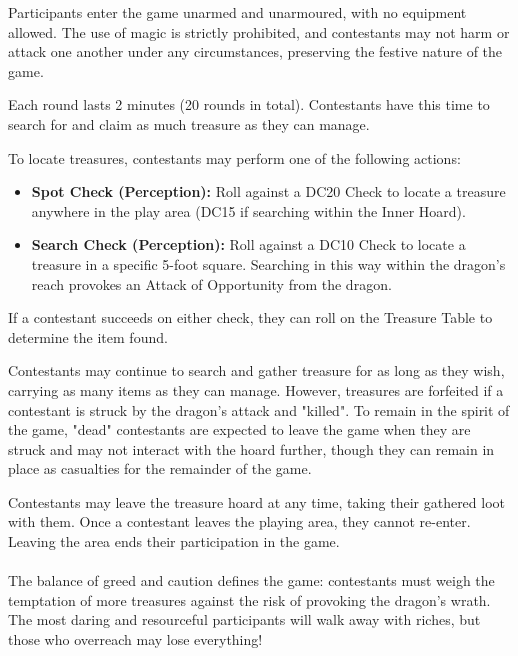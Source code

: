 {\entryfont\noindent Participants enter the game unarmed and unarmoured, with no equipment allowed. The use of magic is strictly prohibited, and contestants may not harm or attack one another under any circumstances, preserving the festive nature of the game.

Each round lasts 2 minutes (20 rounds in total). Contestants have this time to search for and claim as much treasure as they can manage.

To locate treasures, contestants may perform one of the following actions:
\begin{itemize}
	\renewcommand\labelitemi{\textbf{\textbullet}}
	\item \textbf{Spot Check (Perception):} Roll against a DC20 Check to locate a treasure anywhere in the play area (DC15 if searching within the Inner Hoard).
	\item \textbf{Search Check (Perception):} Roll against a DC10 Check to locate a treasure in a specific 5-foot square. Searching in this way within the dragon's reach provokes an Attack of Opportunity from the dragon.
\end{itemize}
If a contestant succeeds on either check, they can roll on the Treasure Table to determine the item found.

Contestants may continue to search and gather treasure for as long as they wish, carrying as many items as they can manage. However, treasures are forfeited if a contestant is struck by the dragon's attack and "killed". To remain in the spirit of the game, "dead" contestants are expected to leave the game when they are struck and may not interact with the hoard further, though they can remain in place as casualties for the remainder of the game.}

{\entryfont\noindent Contestants may leave the treasure hoard at any time, taking their gathered loot with them. Once a contestant leaves the playing area, they cannot re-enter. Leaving the area ends their participation in the game.\\\\
The balance of greed and caution defines the game: contestants must weigh the temptation of more treasures against the risk of provoking the dragon's wrath. The most daring and resourceful participants will walk away with riches, but those who overreach may lose everything!}

